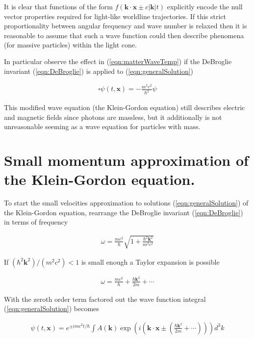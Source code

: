 \documentclass[]{eliblog}
\newcommand{\Abs}[1]{{\left\lvert{#1}\right\rvert}}
\newcommand{\Bk}[0]{\mathbf{k}}
\newcommand{\Bx}[0]{\mathbf{x}}
\newcommand{\delambertian}[0]{\square}
\begin{document}
It is clear that functions of the form $f(\Bk \cdot \Bx \pm c \Abs{\Bk} t)$ explicitly encode the null vector properties required for light-like worldline trajectories.  If this strict proportionality between angular frequency and wave number is relaxed then it is reasonable to assume that such a wave function could then describe phenomena (for massive particles) within the light cone.

In particular observe the effect in (\ref{eqn:matterWaveTemp}) if the DeBroglie invariant (\ref{eqn:DeBroglie}) is applied to (\ref{eqn:generalSolution})

\begin{align}
\delambertian {\psi}(t,\Bx) = -\frac{m^2 c^2}{\hbar^2} \psi
\end{align}

This modified wave equation (the Klein-Gordon equation) still describes electric and magnetic fields since photons are massless, but it additionally is not unreasonable seeming as a wave equation for particles with mass.


\section{Small momentum approximation of the Klein-Gordon equation.}

To start the small velocities approximation to solutions (\ref{eqn:generalSolution}) of the Klein-Gordon equation, rearrange the 
DeBroglie invariant (\ref{eqn:DeBroglie}) in terms of frequency

\begin{align}
\omega = \frac{m c^2}{\hbar} \sqrt{ 1 + \frac{\hbar^2 \Bk^2}{m^2 c^2}}
\end{align}

If $(\hbar^2 \Bk^2)/(m^2 c^2) < 1$ is small enough a Taylor expansion is possible

\begin{align}
\omega = \frac{m c^2}{\hbar} + \frac{\hbar \Bk^2}{2 m} + \cdots
\end{align}

With the zeroth order term factored out the wave function integral (\ref{eqn:generalSolution}) becomes

\begin{align}
{\psi}(t,\Bx) = e^{\pm im c^2 t /\hbar} \int A(\Bk) \exp\left( i \left(\Bk \cdot \Bx \pm \left(\frac{\hbar \Bk^2}{2 m} + \cdots \right) \right) \right) d^3 k
\end{align}
\end{document}
